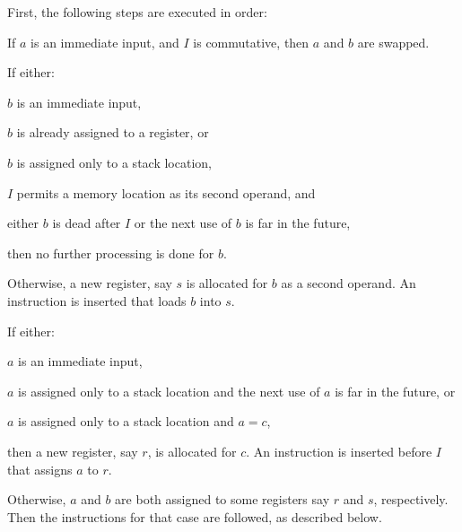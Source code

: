 

First, the following steps are executed in order:

\begin{legal}
\item If $a$ is an immediate input, and $I$ is commutative, then $a$
  and $b$ are swapped.
\item If either:
  \begin{legal}
  \item $b$ is an immediate input,
  \item $b$ is already assigned to a register, or
    \begin{legal}
    \item $b$ is assigned only to a stack location,
    \item $I$ permits a memory location as its second operand, and
    \item either $b$ is dead after $I$ or the next use of $b$ is far
      in the future,
    \end{legal}
  \end{legal}
  then no further processing is done for $b$.
\item Otherwise, a new register, say $s$ is allocated for $b$ as a
  second operand.  An instruction is inserted that loads $b$ into $s$.
\item If either:
  \begin{legal}
  \item $a$ is an immediate input,
  \item $a$ is assigned only to a stack location and the next use of
    $a$ is far in the future, or
  \item $a$ is assigned only to a stack location and $a = c$,
  \end{legal}
  then a new register, say $r$, is allocated for $c$.  An instruction
  is inserted before $I$ that assigns $a$ to $r$.
\item Otherwise, $a$ and $b$ are both assigned to some registers say
  $r$ and $s$, respectively.  Then the instructions for that case are
  followed, as described below.
\end{legal}


